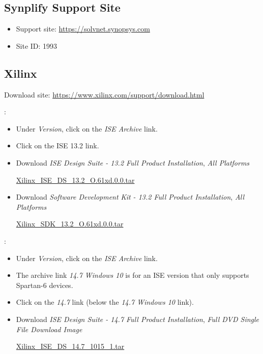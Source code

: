 \documentclass[10pt,twoside]{article}
\begin{document}
\subsection{Synplify Support Site}

\begin{itemize}
\item Support site:
\href{https://solvnet.synopsys.com}{https://solvnet.synopsys.com}
\item Site ID: 1993
\end{itemize}

\subsection{Xilinx}

Download site:
\href{https://www.xilinx.com/support/download.html}{https://www.xilinx.com/support/download.html}

\vskip5mm
:
%
\begin{itemize}

\item Under \emph{Version}, click on the \emph{ISE Archive} link.
\item Click on the ISE 13.2 link.
\item Download \emph{ISE Design Suite - 13.2 Full Product Installation}, \emph{All Platforms}

\href{https://www.xilinx.com/member/forms/download/xef.html?filename=Xilinx_ISE_DS_13.2_O.61xd.0.0.tar}{Xilinx\_ISE\_DS\_13.2\_O.61xd.0.0.tar}

\item Download \emph{Software Development Kit - 13.2 Full Product Installation}, \emph{All Platforms}

\href{https://www.xilinx.com/member/forms/download/xef.html?filename=Xilinx_SDK_13.2_O.61xd.0.0.tar}{Xilinx\_SDK\_13.2\_O.61xd.0.0.tar}
\end{itemize}

\vskip5mm
:
\begin{itemize}
\item Under \emph{Version}, click on the \emph{ISE Archive} link.
\item The archive link \emph{14.7 Windows 10} is for an ISE version that
only supports Spartan-6 devices.
\item Click on the \emph{14.7} link (below the \emph{14.7 Windows 10} link).
\item Download \emph{ISE Design Suite - 14.7 Full Product Installation}, \emph{Full DVD Single File Download Image}

\href{https://www.xilinx.com/member/forms/download/xef.html?filename=Xilinx_ISE_DS_14.7_1015_1.tar}{Xilinx\_ISE\_DS\_14.7\_1015\_1.tar}

\end{itemize}
\end{document}

